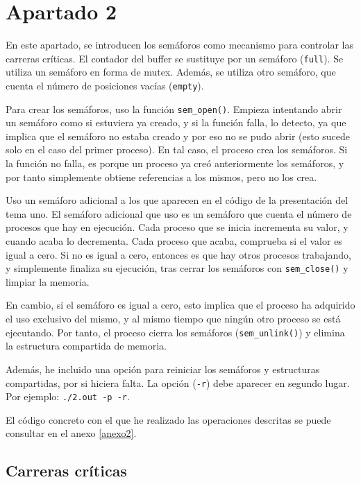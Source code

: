 \documentclass[a4paper]{article}
\begin{document}
\section{Apartado 2}

En este apartado, se introducen los semáforos como mecanismo para controlar las carreras críticas. El contador del buffer se sustituye por un semáforo (\texttt{full}). Se utiliza un semáforo en forma de mutex. Además, se utiliza otro semáforo, que cuenta el número de posiciones vacías (\texttt{empty}).

Para crear los semáforos, uso la función \texttt{sem\_open()}. Empieza intentando abrir un semáforo como si estuviera ya creado, y si la función falla, lo detecto, ya que implica que el semáforo no estaba creado y por eso no se pudo abrir (esto sucede solo en el caso del primer proceso). En tal caso, el proceso crea los semáforos. Si la función no falla, es porque un proceso ya creó anteriormente los semáforos, y por tanto simplemente obtiene referencias a los mismos, pero no los crea.

Uso un semáforo adicional a los que aparecen en el código de la presentación del tema uno. El semáforo adicional que uso es un semáforo que cuenta el número de procesos que hay en ejecución. Cada proceso que se inicia incrementa su valor, y cuando acaba lo decrementa. Cada proceso que acaba, comprueba si el valor es igual a cero. Si no es igual a cero, entonces es que hay otros procesos trabajando, y simplemente finaliza su ejecución, tras cerrar los semáforos con \texttt{sem\_close()} y limpiar la memoria.

En cambio, si el semáforo es igual a cero, esto implica que el proceso ha adquirido el uso exclusivo del mismo, y al mismo tiempo que ningún otro proceso se está ejecutando. Por tanto, el proceso cierra los semáforos (\texttt{sem\_unlink()}) y elimina la estructura compartida de memoria.

Además, he incluido una opción para reiniciar los semáforos y estructuras compartidas, por si hiciera falta. La opción (\texttt{-r}) debe aparecer en segundo lugar. Por ejemplo: \texttt{./2.out -p -r}.

El código concreto con el que he realizado las operaciones descritas se puede consultar en el anexo \ref{anexo2}.

\subsection{Carreras críticas}
\end{document}
